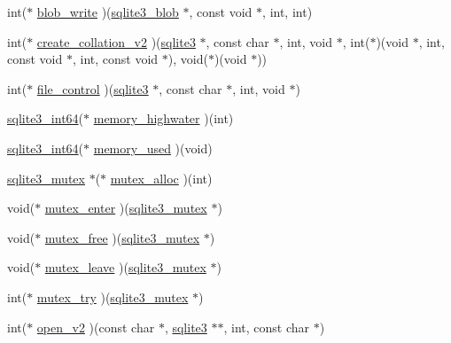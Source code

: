 \begin{DoxyCompactItemize}
\item 
int($\ast$ \hyperlink{structsqlite3__api__routines_a839a00c8de419e217288953ed6e5944e}{blob\+\_\+write} )(\hyperlink{sqlite3_8c_a3eb4857c157c542bb3fb7d8cbf38a662}{sqlite3\+\_\+blob} $\ast$, const void $\ast$, int, int)
\item 
int($\ast$ \hyperlink{structsqlite3__api__routines_af08608f15c694b8f19f4ad8b7c82e43f}{create\+\_\+collation\+\_\+v2} )(\hyperlink{structsqlite3}{sqlite3} $\ast$, const char $\ast$, int, void $\ast$, int($\ast$)(void $\ast$, int, const void $\ast$, int, const void $\ast$), void($\ast$)(void $\ast$))
\item 
int($\ast$ \hyperlink{structsqlite3__api__routines_a0b02da5c8741506c6c10c3a4cf6b768b}{file\+\_\+control} )(\hyperlink{structsqlite3}{sqlite3} $\ast$, const char $\ast$, int, void $\ast$)
\item 
\hyperlink{sqlite3_8c_a0a4d3e6c1ad46f90e746b920ab6ca0d2}{sqlite3\+\_\+int64}($\ast$ \hyperlink{structsqlite3__api__routines_a36b5143cf264308003cba66ffe90b12e}{memory\+\_\+highwater} )(int)
\item 
\hyperlink{sqlite3_8c_a0a4d3e6c1ad46f90e746b920ab6ca0d2}{sqlite3\+\_\+int64}($\ast$ \hyperlink{structsqlite3__api__routines_ae625a716ceecf9b19286decb320142f2}{memory\+\_\+used} )(void)
\item 
\hyperlink{structsqlite3__mutex}{sqlite3\+\_\+mutex} $\ast$($\ast$ \hyperlink{structsqlite3__api__routines_a1af4db8b3172987e3a0a7a6563236adb}{mutex\+\_\+alloc} )(int)
\item 
void($\ast$ \hyperlink{structsqlite3__api__routines_ada638e2fd1599c0afb7a5f446a994f5e}{mutex\+\_\+enter} )(\hyperlink{structsqlite3__mutex}{sqlite3\+\_\+mutex} $\ast$)
\item 
void($\ast$ \hyperlink{structsqlite3__api__routines_a18fbbf680b1a0e6a2e14f7f3a4d7b888}{mutex\+\_\+free} )(\hyperlink{structsqlite3__mutex}{sqlite3\+\_\+mutex} $\ast$)
\item 
void($\ast$ \hyperlink{structsqlite3__api__routines_a2992e367409871e35e5094a8ea2e7be2}{mutex\+\_\+leave} )(\hyperlink{structsqlite3__mutex}{sqlite3\+\_\+mutex} $\ast$)
\item 
int($\ast$ \hyperlink{structsqlite3__api__routines_af79d9da98d2257754895a48ae553dd06}{mutex\+\_\+try} )(\hyperlink{structsqlite3__mutex}{sqlite3\+\_\+mutex} $\ast$)
\item 
int($\ast$ \hyperlink{structsqlite3__api__routines_a64695f272360a807813ba8d1af0291aa}{open\+\_\+v2} )(const char $\ast$, \hyperlink{structsqlite3}{sqlite3} $\ast$$\ast$, int, const char $\ast$)
$$
\end{DoxyCompactItemize}
